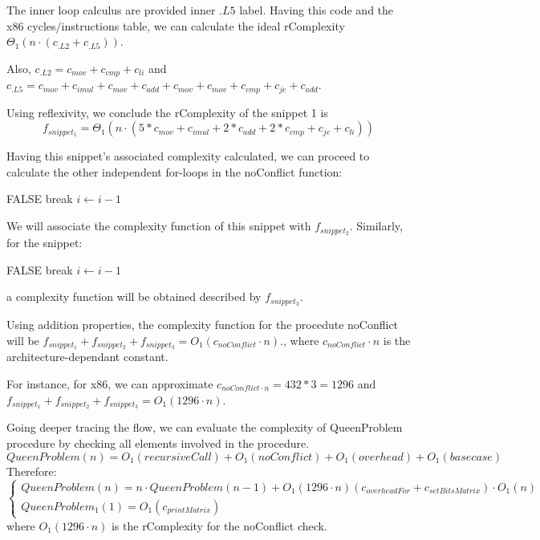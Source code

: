 The inner loop calculus are provided inner $.L5$ label. Having this code and the x86 cycles/instructions table, we can calculate the ideal rComplexity $\Theta_{1}(n \cdot (c_{.L2} + c_{.L5}))$. 

Also, $c_{.L2} = c_{mov} + c_{cmp} + c_{li}$ and $c_{.L5} = c_{mov} + c_{imul} + c_{mov} +  c_{add} + c_{mov} + c_{mov} + c_{cmp} + c_{je} + c_{add} $. 

Using reflexivity, we conclude the rComplexity of the snippet 1 is \[f_{snippet_{1}} =  \Theta_{1}(n \cdot ( 5 * c_{mov} + c_{imul} + 2 * c_{add} +2 *  c_{cmp} + c_{je} + c_{li}))\]

Having this snippet's associated complexity calculated, we can proceed to calculate the other independent for-loops in the noConflict function:
\begin{algorithmic}[1]
			\State \Return FALSE
		\EndIf
		\State break
	\EndIf
	\State $i \gets i-1$	
	\EndFor
\end{algorithmic}
We will associate the complexity function of this snippet with $f_{snippet_{2}}$. Similarly, for the snippet:

\begin{algorithmic}[1]
			\State \Return FALSE
		\EndIf
		\State break
	\EndIf
	\State $i \gets i-1$	
	\EndFor
\end{algorithmic}
a complexity function will be obtained described by $f_{snippet_{3}}$.

Using addition properties, the complexity function for the procedute noConflict will be $f_{snippet_{1}} + f_{snippet_{2}} + f_{snippet_{3}} = O_{1}(c_{noConflict} \cdot n)$., where $c_{noConflict} \cdot n$ is the architecture-dependant constant.

 For instance, for x86, we can approximate $c_{noConflict \cdot n} = 432 * 3 = 1296$ and $f_{snippet_{1}} + f_{snippet_{2}} + f_{snippet_{3}} = O_{1}(1296 \cdot n) $.



Going deeper tracing the flow, we can evaluate the complexity of QueenProblem procedure by checking all elements involved in the procedure.
 \[QueenProblem(n) = O_{1}(recursiveCall) + O_{1}(noConflict) + O_{1}(overhead) + O_{1}(basecase) \]
Therefore:
 \[\begin{cases} QueenProblem(n) = n \cdot QueenProblem(n-1) +  O_{1}(1296 \cdot n) (c_{overheadFor} + c_{setBitsMatrix}) \cdot O_{1}(n) \\ QueenProblem_{1}(1)=O_{1}(c_{printMatrix}) \end{cases}\]
 where $O_{1}(1296 \cdot n)$ is the rComplexity for the noConflict check.
 
